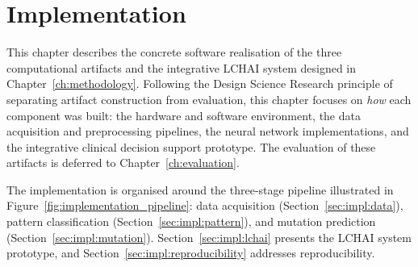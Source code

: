 
\chapter{Implementation}
\label{ch:implementation}

This chapter describes the concrete software realisation of the three computational artifacts and the integrative LCHAI system designed in Chapter~\ref{ch:methodology}.
Following the Design Science Research principle of separating artifact construction from evaluation, this chapter focuses on \emph{how} each component was built: the hardware and software environment, the data acquisition and preprocessing pipelines, the neural network implementations, and the integrative clinical decision support prototype.
The evaluation of these artifacts is deferred to Chapter~\ref{ch:evaluation}.

The implementation is organised around the three-stage pipeline illustrated in Figure~\ref{fig:implementation_pipeline}: data acquisition (Section~\ref{sec:impl:data}), pattern classification (Section~\ref{sec:impl:pattern}), and mutation prediction (Section~\ref{sec:impl:mutation}).
Section~\ref{sec:impl:lchai} presents the LCHAI system prototype, and Section~\ref{sec:impl:reproducibility} addresses reproducibility.


